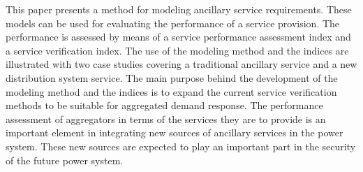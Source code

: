 This paper presents a method for modeling ancillary service requirements. These models can be used  for evaluating the performance of a service provision. The performance is assessed by means of a service performance assessment index and a service verification index. The use of the modeling method and the indices are illustrated with two case studies covering a traditional ancillary service and a new distribution system service. The main purpose behind the development of the modeling method and the indices is to expand the current service verification methods to be suitable for aggregated demand response. 
The performance assessment of aggregators in terms of the services they are to provide is an important element in integrating new sources of ancillary services in the power system. These new sources are expected to play an important part in the security of the future power system. %

